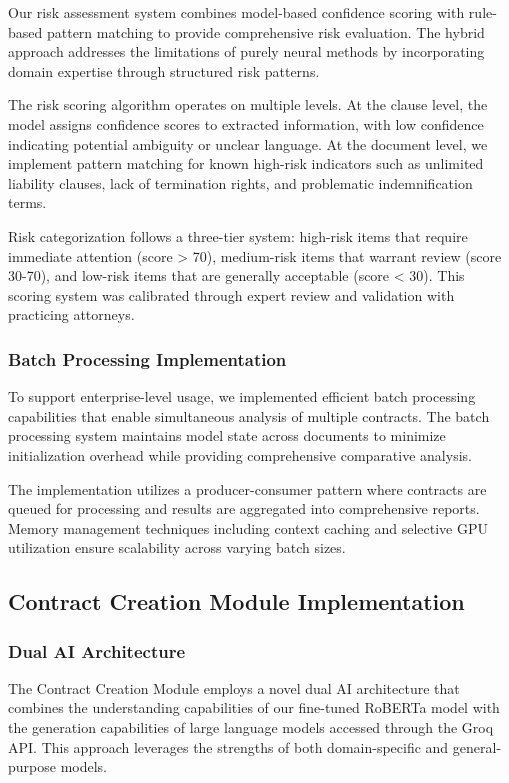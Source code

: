 Our risk assessment system combines model-based confidence scoring with rule-based pattern matching to provide comprehensive risk evaluation. The hybrid approach addresses the limitations of purely neural methods by incorporating domain expertise through structured risk patterns.

The risk scoring algorithm operates on multiple levels. At the clause level, the model assigns confidence scores to extracted information, with low confidence indicating potential ambiguity or unclear language. At the document level, we implement pattern matching for known high-risk indicators such as unlimited liability clauses, lack of termination rights, and problematic indemnification terms.

Risk categorization follows a three-tier system: high-risk items that require immediate attention (score > 70), medium-risk items that warrant review (score 30-70), and low-risk items that are generally acceptable (score < 30). This scoring system was calibrated through expert review and validation with practicing attorneys.

\subsubsection{Batch Processing Implementation}

To support enterprise-level usage, we implemented efficient batch processing capabilities that enable simultaneous analysis of multiple contracts. The batch processing system maintains model state across documents to minimize initialization overhead while providing comprehensive comparative analysis.

The implementation utilizes a producer-consumer pattern where contracts are queued for processing and results are aggregated into comprehensive reports. Memory management techniques including context caching and selective GPU utilization ensure scalability across varying batch sizes.

\subsection{Contract Creation Module Implementation}

\subsubsection{Dual AI Architecture}

The Contract Creation Module employs a novel dual AI architecture that combines the understanding capabilities of our fine-tuned RoBERTa model with the generation capabilities of large language models accessed through the Groq API. This approach leverages the strengths of both domain-specific and general-purpose models.

